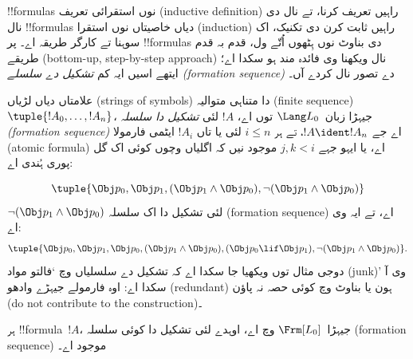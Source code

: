 \documentclass[../../../include/open-logic-section]{subfiles}
\begin{document}


!!{formula}s نوں استقرائی تعریف (inductive definition) راہیں تعریف
کرنا، تے نال دی نال !!{formula}s دیاں خاصیتاں نوں استقرا (induction)
راہیں ثابت کرن دی تکنیک، اک سوہنا
تے کارگر طریقہ اے۔ پر !!{formula}s دی بناوٹ نوں ہِٹھوں اُتّے ول، قدم
بہ قدم طریقے (bottom-up, step-by-step approach) نال ویکھنا وی فائدہ
مند ہو سکدا اے؛ ایتھے اسیں ایہ کم \emph{تشکیل دے سلسلے (formation
sequence)} دے تصور نال کردے آں۔

\begin{defn}
علامتاں دیاں لڑیاں (strings of symbols) دا متناہی متوالیہ (finite
sequence) $\tuple{!A_0,\dotsc,!A_n}$، جیہڑا زبان~$\Lang L_0$ توں اے،
$!A$ لئی \emph{تشکیل دا سلسلہ (formation sequence)} اے جے
$!A \ident !A_n$، تے ہر $i \leq n$ لئی یا تاں $!A_i$ ایٹمی فارمولا
 (atomic formula) اے، یا ایہو جہے $j,k < i$ موجود نیں کہ اگلیاں وچوں کوئی اک گل پوری
ہُندی اے:
\begin{enumerate}
\end{enumerate}
\end{defn}

\begin{ex}
\[
\tuple{
    \Obj p_0,
    \Obj p_1,
    (\Obj p_1 \land \Obj p_0),
    \lnot (\Obj p_1 \land \Obj p_0)
}
\]
$\lnot (\Obj p_1 \land \Obj p_0)$ لئی تشکیل دا اک سلسلہ (formation
sequence) اے، تے ایہ وی اے:
\[
\tuple{
    \Obj p_0,
    \Obj p_1,
    \Obj p_0,
    (\Obj p_1 \land \Obj p_0),
    (\Obj p_0 \lif \Obj p_1),
    \lnot (\Obj p_1 \land \Obj p_0)
}.
\]
%
دوجی مثال توں ویکھیا جا سکدا اے کہ تشکیل دے سلسلیاں وچ `فالتو مواد
(junk)' وی آ سکدا اے: اوہ فارمولے جیہڑے وادھو (redundant) ہون یا
بناوٹ وچ کوئی حصہ نہ پاؤن (do not contribute to the construction)۔
\end{ex}

\begin{prop}
ہر !!{formula}~$!A$، جیہڑا~$\Frm[L_0]$ وچ اے، اوہدے لئی تشکیل دا کوئی
سلسلہ (formation sequence) موجود اے۔
\end{prop}
\end{document}
